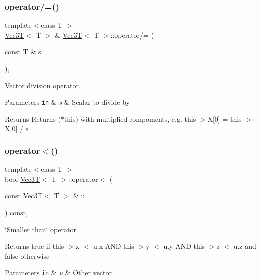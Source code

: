 \subsubsection{\texorpdfstring{operator/=()}{operator/=()}}
{\footnotesize\ttfamily template$<$class T $>$ \\
\hyperlink{classVec3T}{Vec3T}$<$ T $>$ \& \hyperlink{classVec3T}{Vec3T}$<$ T $>$\+::operator/= (\begin{DoxyParamCaption}\item[{const T \&}]{s }\end{DoxyParamCaption})\hspace{0.3cm}{\ttfamily [inline]}, {\ttfamily [noexcept]}}



Vector division operator. 


\begin{DoxyParams}[1]{Parameters}
\mbox{\tt in}  & {\em s} & Scalar to divide by \\
\hline
\end{DoxyParams}
\begin{DoxyReturn}{Returns}
Returns ($\ast$this) with multiplied compoments, e.\+g. this-\/$>$X\mbox{[}0\mbox{]} = this-\/$>$X\mbox{[}0\mbox{]} / s 
\end{DoxyReturn}
\mbox{\label{classVec3T_aba830919c5020bb060f39fe9df6b7ca1}} 
\subsubsection{\texorpdfstring{operator$<$()}{operator<()}}
{\footnotesize\ttfamily template$<$class T $>$ \\
bool \hyperlink{classVec3T}{Vec3T}$<$ T $>$\+::operator$<$ (\begin{DoxyParamCaption}\item[{const \hyperlink{classVec3T}{Vec3T}$<$ T $>$ \&}]{u }\end{DoxyParamCaption}) const\hspace{0.3cm}{\ttfamily [inline]}, {\ttfamily [noexcept]}}



\char`\"{}\+Smaller than\char`\"{} operator. 

Returns true if this-\/$>$x $<$ u.\+x A\+ND this-\/$>$y $<$ u.\+y A\+ND this-\/$>$z $<$ u.\+z and false otherwise 
\begin{DoxyParams}[1]{Parameters}
\mbox{\tt in}  & {\em u} & Other vector \\
\hline
\end{DoxyParams}
\mbox{\label{classVec3T_a266a34a83b9f23a391151be45a4e39f8}} 
